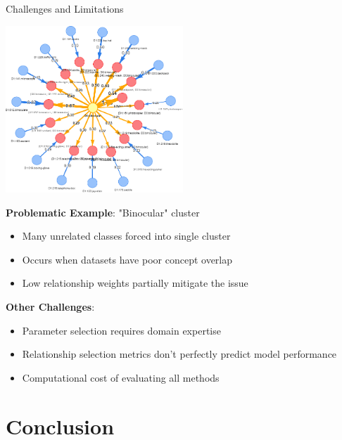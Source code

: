 \documentclass[aspectratio=169]{beamer}
\begin{document}
\begin{frame}{Challenges and Limitations}
    \begin{center}
        \includegraphics[width=0.5\textwidth]{../thesis/figures/bad_taxonomy.png}
    \end{center}

    \textbf{Problematic Example}: "Binocular" cluster
    \begin{itemize}
        \item Many unrelated classes forced into single cluster
        \item Occurs when datasets have poor concept overlap
        \item Low relationship weights partially mitigate the issue
    \end{itemize}

    \vspace{1em}

    \textbf{Other Challenges}:
    \begin{itemize}
        \item Parameter selection requires domain expertise
        \item Relationship selection metrics don't perfectly predict model performance
        \item Computational cost of evaluating all methods
    \end{itemize}
\end{frame}

\section{Conclusion}
\end{document}
